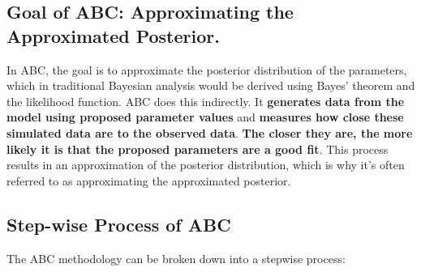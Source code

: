 \documentclass{article}
\begin{document}
\subsection{Goal of ABC:  Approximating the Approximated Posterior.}
In ABC, the goal is to approximate the posterior distribution of the parameters, which in traditional Bayesian analysis would be derived using Bayes' theorem and the likelihood function. ABC does this indirectly. It \textbf{generates data from the model using proposed parameter values} and \textbf{measures how close these simulated data are to the observed data}. \textbf{The closer they are, the more likely it is that the proposed parameters are a good fit}. This process results in an approximation of the posterior distribution, which is why it's often referred to as approximating the approximated posterior.

\subsection{Step-wise Process of ABC}

The ABC methodology can be broken down into a stepwise process:
\end{document}
